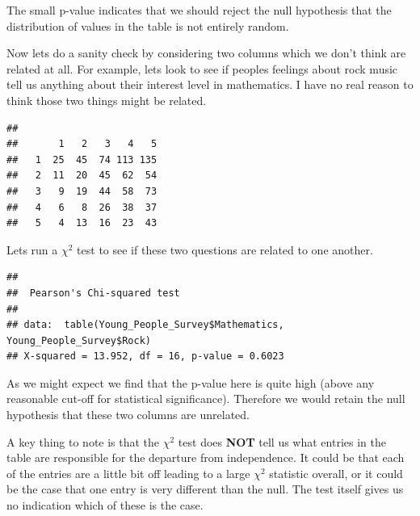 \documentclass[
]{book}
\newenvironment{Shaded}{\begin{snugshade}}{\end{snugshade}}
\newcommand{\FunctionTok}[1]{\textcolor[rgb]{0.00,0.00,0.00}{#1}}
\newcommand{\NormalTok}[1]{#1}
\newcommand{\SpecialCharTok}[1]{\textcolor[rgb]{0.00,0.00,0.00}{#1}}
\theoremstyle{definition}
\theoremstyle{definition}
\theoremstyle{definition}
\theoremstyle{definition}
\theoremstyle{remark}
\begin{document}
The small p-value indicates that we should reject the null hypothesis that the distribution of values in the table is not entirely random.

Now lets do a sanity check by considering two columns which we don't think are related at all. For example, lets look to see if peoples feelings about rock music tell us anything about their interest level in mathematics. I have no real reason to think those two things might be related.

\begin{Shaded}
\end{Shaded}

\begin{verbatim}
##    
##       1   2   3   4   5
##   1  25  45  74 113 135
##   2  11  20  45  62  54
##   3   9  19  44  58  73
##   4   6   8  26  38  37
##   5   4  13  16  23  43
\end{verbatim}

Lets run a \(\chi^2\) test to see if these two questions are related to one another.

\begin{Shaded}
\end{Shaded}

\begin{verbatim}
## 
##  Pearson's Chi-squared test
## 
## data:  table(Young_People_Survey$Mathematics, Young_People_Survey$Rock)
## X-squared = 13.952, df = 16, p-value = 0.6023
\end{verbatim}

As we might expect we find that the p-value here is quite high (above any reasonable cut-off for statistical significance). Therefore we would retain the null hypothesis that these two columns are unrelated.

A key thing to note is that the \(\chi^2\) test does \textbf{NOT} tell us what entries in the table are responsible for the departure from independence. It could be that each of the entries are a little bit off leading to a large \(\chi^2\) statistic overall, or it could be the case that one entry is very different than the null. The test itself gives us no indication which of these is the case.
\end{document}
